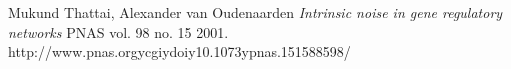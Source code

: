 \documentclass[oneside]{labbook}
\begin{document}
\begin{thebibliography}{2}
Mukund Thattai, Alexander van Oudenaarden
\emph{Intrinsic noise in gene regulatory networks}
PNAS vol. 98 no. 15
2001.
http://www.pnas.orgycgiydoiy10.1073ypnas.151588598/
\end{thebibliography}
\end{document}
